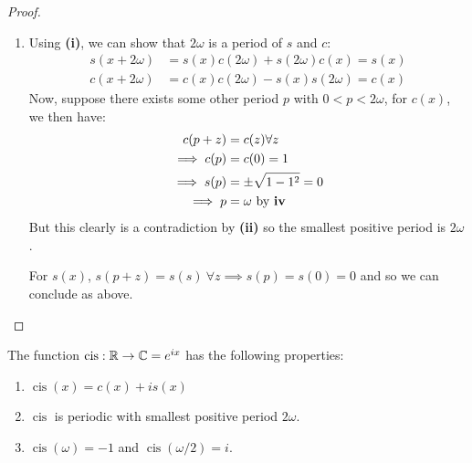 \documentclass[../main.tex]{subfiles}
\begin{document}
\begin{proof}
\begin{enumerate}
      Finally, using the addition identity with $t/2$:
      \[
        s(t) = 2s(t/2)c(t/2) = 0 \implies s(t/2) = 0 \text{ for } 0 \leq t/2 < \omega/2
      \]
      We know that $c(t/2)$ cannot be 0 as in \cref{trigPeriodicity} we proved that $\omega/2$ was the smallest positive root for $c(x)$.
      As shown previously, $s(0) = 0$ and $s(x)$ is increasing on $[0, \omega/2)$ so we conclude that $t = 0 \implies x = k\omega$.
    \item
      Using \textbf{(i)}, we can show that $2\omega$ is a period of $s$ and $c$:
      \begin{align*}
        s(x + 2\omega) &= s(x)c(2\omega) + s(2\omega)c(x) = s(x) \\
        c(x + 2\omega) &= c(x)c(2\omega) - s(x)s(2\omega) = c(x)
      \end{align*}
      Now, suppose there exists some other period $p$ with $0 < p < 2\omega$, for $c(x)$, we then have:
      \begin{align*}
        c(p + z) &= c(z) \forall z \\
        \implies c(p) &= c(0) = 1 \\
        \implies s(p) &= \pm\sqrt{1 - 1^2} = 0 \\
        \implies p &= \omega \text{ by \textbf{iv}}
      \end{align*}
      But this clearly is a contradiction by \textbf{(ii)} so the smallest positive period is $2\omega$.

      For $s(x)$, $s(p + z) = s(s)\ \forall z \implies s(p) = s(0) = 0$ and so we can conclude as above.
  \end{enumerate}
\end{proof}
\begin{corollary}
  The function $\operatorname{cis}: \mathbb{R} \to \mathbb{C} = e^{ix}$ has the following properties: \label{cisIdentities}
  \begin{enumerate}
    \item $\operatorname{cis}(x) = c(x) + is(x)$
    \item $\operatorname{cis}$ is periodic with smallest positive period $2\omega$.
    \item $\operatorname{cis}(\omega) = -1$ and $\operatorname{cis}(\omega/2) = i$.
  \end{enumerate}
\end{corollary}
\end{document}
